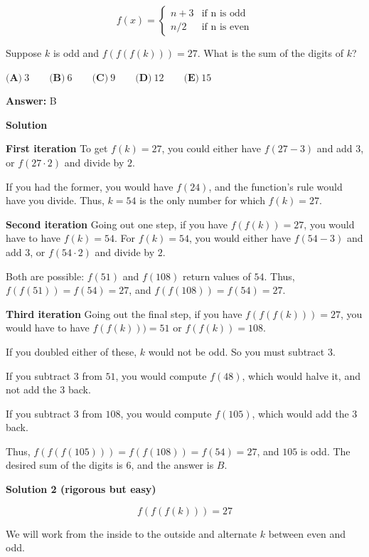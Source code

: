 \begin{enumerate}
 
 \[f(x) =\begin{cases}n+3 &\text{if n is odd}\\ n/2 &\text{if n is even}\end{cases}\]


 Suppose $k$ is odd and $f(f(f(k))) = 27$.  What is the sum of the digits of $k$?


 $\textbf{(A)}\ 3\qquad\textbf{(B)}\ 6\qquad\textbf{(C)}\ 9\qquad\textbf{(D)}\ 12\qquad\textbf{(E)}\ 15$

 \textbf{Answer: }B



\textbf{Solution}

\textbf{First iteration} To get $f(k) = 27$, you could either have $f(27 - 3)$ and add $3$, or $f(27\cdot 2)$ and divide by $2$.

 If you had the former, you would have $f(24)$, and the function's rule would have you divide.  Thus, $k=54$ is the only number for which $f(k) = 27$.

 \textbf{Second iteration} Going out one step, if you have $f(f(k)) = 27$, you would have to have $f(k) = 54$.   For $f(k) = 54$, you would either have $f(54-3)$ and add $3$, or $f(54\cdot 2)$ and divide by $2$.

 Both are possible:  $f(51)$ and $f(108)$ return values of $54$.  Thus, $f(f(51)) = f(54) = 27$, and $f(f(108)) = f(54) = 27$.

 


 \textbf{Third iteration} Going out the final step, if you have $f(f(f(k))) = 27$, you would have to have $f(f(k))) = 51$ or $f(f(k)) = 108$.

 If you doubled either of these, $k$ would not be odd.  So you must subtract $3$.

 If you subtract $3$ from $51$, you would compute $f(48)$, which would halve it, and not add the $3$ back.

 If you subtract $3$ from $108$, you would compute $f(105)$, which would add the $3$ back.

 Thus, $f(f(f(105))) = f(f(108)) = f(54) = 27$, and $105$ is odd.  The desired sum of the digits is $6$, and the answer is $\boxed{B}$.

 



\textbf{Solution 2 (rigorous but easy)}


 \[f(f(f(k))) = 27\]

 We will work from the inside to the outside and alternate \( k \) between even and odd.


\end{enumerate}
